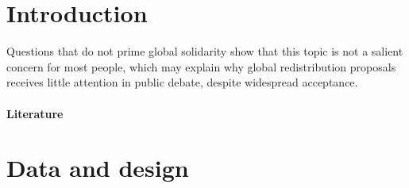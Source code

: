 \documentclass[12pt,english]{article}
\begin{document}

\clearpage
\tableofcontents

\onehalfspacing %

\begin{bibunit}

\section{Introduction}%

Questions that do not prime global solidarity show that this topic is not a salient concern for most people, which may explain why global redistribution proposals receives little attention in public debate, despite widespread acceptance. 


\paragraph{Literature} 

\section{Data and design\label{sec:data}}


\end{bibunit}
\end{document}
